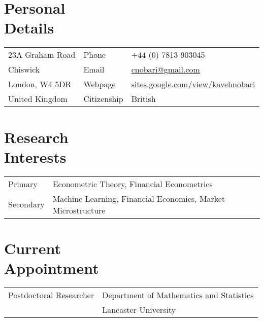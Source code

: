 \documentclass[margin,line,pifont,palatino,courier]{res}
\begin{document}

\begin{resume}

\section{\sc \bf Personal\\ Details}

\vspace{.05in}

\begin{tabular}{@{}p{2.0in}p{0.70in}p{3.5in}}
23A Graham Road & Phone &+44 (0) 7813 903045 \\
Chiswick                        &Email &\href{mailto: cnobari@gmail.com}{cnobari@gmail.com}\\
London, W4 5DR      &Webpage &\href{https://sites.google.com/view/kavehnobari}{sites.google.com/view/kavehnobari}\\
United Kingdom      & Citizenship &British\\
\end{tabular}

\hrulefill
\section{\sc \bf Research\\ Interests}
\begin{tabular}{@{}p{0.65in}p{5in}}
Primary & Econometric Theory, Financial Econometrics \\
\rule{0pt}{4ex}Secondary      &Machine Learning, Financial Economics, Market Microstructure  \\
\end{tabular}

\hrulefill

\section{\sc \bf Current\\ Appointment}

\begin{tabular}{@{}p{1.75in}p{5in}}
Postdoctoral Researcher & Department of Mathematics and Statistics\\
&Lancaster University
\end{tabular}



\hrulefill


\end{resume}
\end{document}
